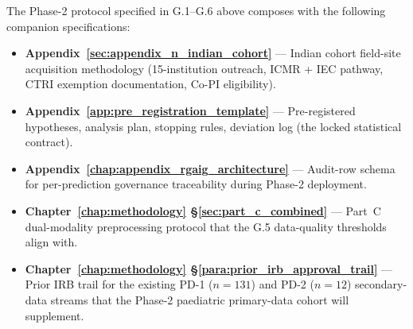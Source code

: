\noindent The Phase-2 protocol specified in G.1--G.6 above composes with the following companion specifications:
\begin{itemize}[leftmargin=*, itemsep=2pt]
    \item \textbf{Appendix~\ref{sec:appendix_n_indian_cohort}} --- Indian cohort field-site acquisition methodology (15-institution outreach, ICMR + IEC pathway, CTRI exemption documentation, Co-PI eligibility).
    \item \textbf{Appendix~\ref{app:pre_registration_template}} --- Pre-registered hypotheses, analysis plan, stopping rules, deviation log (the locked statistical contract).
    \item \textbf{Appendix~\ref{chap:appendix_rgaig_architecture}} --- Audit-row schema for per-prediction governance traceability during Phase-2 deployment.
    \item \textbf{Chapter~\ref{chap:methodology} §\ref{sec:part_c_combined}} --- Part~C dual-modality preprocessing protocol that the G.5 data-quality thresholds align with.
    \item \textbf{Chapter~\ref{chap:methodology} §\ref{para:prior_irb_approval_trail}} --- Prior IRB trail for the existing PD-1 ($n{=}131$) and PD-2 ($n{=}12$) secondary-data streams that the Phase-2 paediatric primary-data cohort will supplement.
\end{itemize}


